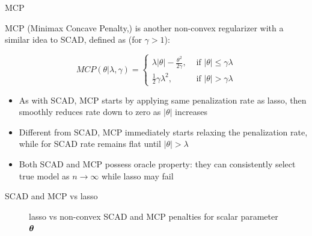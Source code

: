 \documentclass[11pt,compress,t,notes=noshow, xcolor=table]{beamer}
\begin{document}
\begin{vbframe}{MCP}

MCP ({\footnotesize{Minimax Concave Penalty},}) is another non-convex regularizer with a similar idea to SCAD, defined as (for $\gamma>1$):

$$
MCP(\theta | \lambda, \gamma)= \begin{cases}\lambda|\theta|-\frac{\theta^2}{2 \gamma}, & \text { if }|\theta| \leq \gamma \lambda \\ \frac{1}{2} \gamma \lambda^2, & \text { if }|\theta|>\gamma \lambda\end{cases}
$$
\vspace{0.3cm}
\begin{itemize}\setlength{\itemsep}{1.3em}
    \item As with SCAD, MCP starts by applying same penalization rate as lasso, then smoothly reduces rate down to zero as $|\theta|$ increases
    \item Different from SCAD, MCP immediately starts relaxing the penalization rate, while for SCAD rate remains flat until $|\theta|>\lambda$
    \item Both SCAD and MCP possess oracle property: they can consistently select true model as $n \to \infty$ while lasso may fail
\end{itemize}

\end{vbframe}

\begin{vbframe}{SCAD and MCP vs lasso}

\begin{figure}
      \centering
        \caption{\footnotesize lasso vs non-convex SCAD and MCP penalties for scalar parameter $\bm{\theta}$}
    \end{figure}
\end{vbframe}

\endlecture
\end{document}
